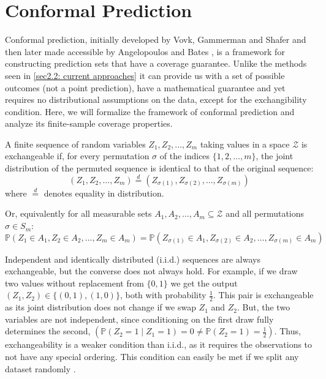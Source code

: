 \section{Conformal Prediction}
\label{sec2.3: conformal prediction}
Conformal prediction, initially developed by Vovk, Gammerman and Shafer \cite{vovk2005algorithmic} and then later 
made accessible by Angelopoulos and Bates \cite{angelopoulos2023conformal}, is a framework for constructing prediction 
sets that have a coverage guarantee. Unlike the methods seen in \ref{sec2.2: current approaches} it can provide us with a 
set of possible outcomes (not a point prediction), have a mathematical guarantee and yet requires no distributional 
assumptions on the data, except for the exchangibility condition. Here, we will formalize the framework of 
conformal prediction and analyze its finite-sample coverage properties.

\begin{definition}[Exchangeability]
\label{def: exchangeability}
A finite sequence of random variables $Z_1, Z_2, \dots, Z_m$ taking values in a space $\mathcal{Z}$ is exchangeable if, 
for every permutation $\sigma$ of the indices $\{1, 2, \dots, m\}$, the joint distribution of the permuted sequence is 
identical to that of the original sequence:
$$(Z_1, Z_2, \dots, Z_m) \overset{d}{=} (Z_{\sigma(1)}, Z_{\sigma(2)}, \dots, Z_{\sigma(m)})$$
where $\overset{d}{=}$ denotes equality in distribution.

Or, equivalently for all measurable sets $A_1, A_2, \dots, A_m \subseteq \mathcal{Z}$ and all permutations 
$\sigma \in S_m$:
$$\mathbb{P}(Z_1 \in A_1, Z_2 \in A_2, \dots, Z_m \in A_m) = \mathbb{P}(Z_{\sigma(1)} \in A_1, Z_{\sigma(2)} \in A_2, 
\dots, Z_{\sigma(m)} \in A_m)$$ 
\end{definition}


Independent and identically distributed (i.i.d.) sequences are always exchangeable, but the converse does 
not always hold. For example, if we draw two values without replacement from $\{0,1\}$ we get the output $(Z_1, Z_2) \in 
\{(0,1), (1,0)\}$, both with probability $\frac{1}{2}$. This pair is exchangeable as its joint distribution 
does not change if we swap $Z_1$ and $Z_2$. But, the two variables are not independent, since conditioning on the 
first draw fully determines the second, $\left(\mathbb{P}(Z_2 = 1 \mid Z_1 = 1) = 0 \neq \mathbb{P}(Z_2 = 1) = \frac{1}{2}\right)$. 
Thus, exchangeability is a weaker condition than i.i.d., as it requires the observations to not have any special ordering. 
This condition can easily be met if we split any dataset randomly \cite{ochoarivera2024conformal, vovk2005algorithmic}.  


